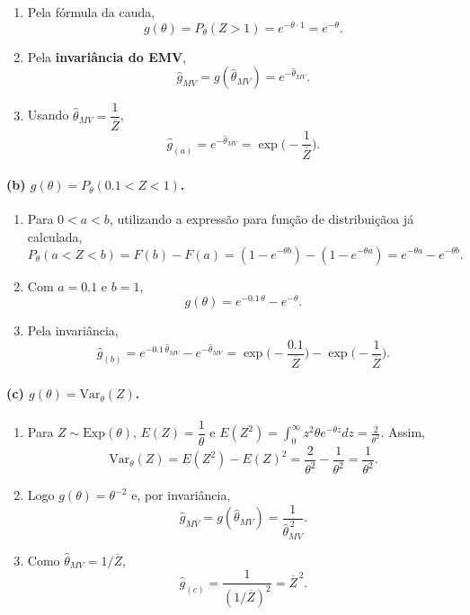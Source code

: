 \begin{enumerate}
  \item Pela fórmula da cauda,
  \[
  g(\theta)=P_\theta(Z>1)=e^{-\theta\cdot 1}=e^{-\theta}.
  \]
  \item Pela \textbf{invariância do EMV},
  \[
  \widehat g_{MV}=g(\widehat\theta_{MV})=e^{-\widehat\theta_{MV}}.
  \]
  \item Usando \(\widehat\theta_{MV}=\dfrac{1}{\overline Z}\),
  \[
  \boxed{\;\widehat g_{(a)}=e^{-\widehat\theta_{MV}}
        =\exp\!\Big(-\frac{1}{\overline Z}\Big).\;}
  \]
\end{enumerate}

\bigskip
\paragraph{(b) \(g(\theta)=P_\theta(0.1<Z<1)\).}

\begin{enumerate}
  \item Para \(0<a<b\), utilizando a expressão para função de distribuiçãoa já calculada,
  \[
  P_\theta(a<Z<b)=F(b)-F(a)=(1-e^{-\theta b})-(1-e^{-\theta a})
                 =e^{-\theta a}-e^{-\theta b}.
  \]
  \item Com \(a=0.1\) e \(b=1\),
  \[
  g(\theta)=e^{-0.1\,\theta}-e^{-\theta}.
  \]
  \item Pela invariância,
  \[
  \boxed{\;\widehat g_{(b)}=e^{-0.1\,\widehat\theta_{MV}}-e^{-\widehat\theta_{MV}}
        =\exp\!\Big(-\frac{0.1}{\overline Z}\Big)-\exp\!\Big(-\frac{1}{\overline Z}\Big).\;}
  \]
\end{enumerate}

\bigskip
\paragraph{(c) \(g(\theta)=\mathrm{Var}_\theta(Z)\).}

\begin{enumerate}
  \item Para \(Z\sim\mathrm{Exp}(\theta)\), \(E(Z)=\dfrac{1}{\theta}\) e
        \(E(Z^2)=\displaystyle\int_0^\infty z^2\theta e^{-\theta z}dz
                 =\frac{2}{\theta^2}\).
        Assim,
        \[
        \mathrm{Var}_\theta(Z)=E(Z^2)-E(Z)^2=\frac{2}{\theta^2}-\frac{1}{\theta^2}
        =\frac{1}{\theta^2}.
        \]
  \item Logo \(g(\theta)=\theta^{-2}\) e, por invariância,
        \[
        \widehat g_{MV}=g(\widehat\theta_{MV})=\frac{1}{\widehat\theta_{MV}^{\,2}}.
        \]
  \item Como \(\widehat\theta_{MV}=1/\overline Z\),
        \[
        \boxed{\;\widehat g_{(c)}=\frac{1}{(1/\overline Z)^2}=\overline Z^{\,2}. \;}
        \]
\end{enumerate}

